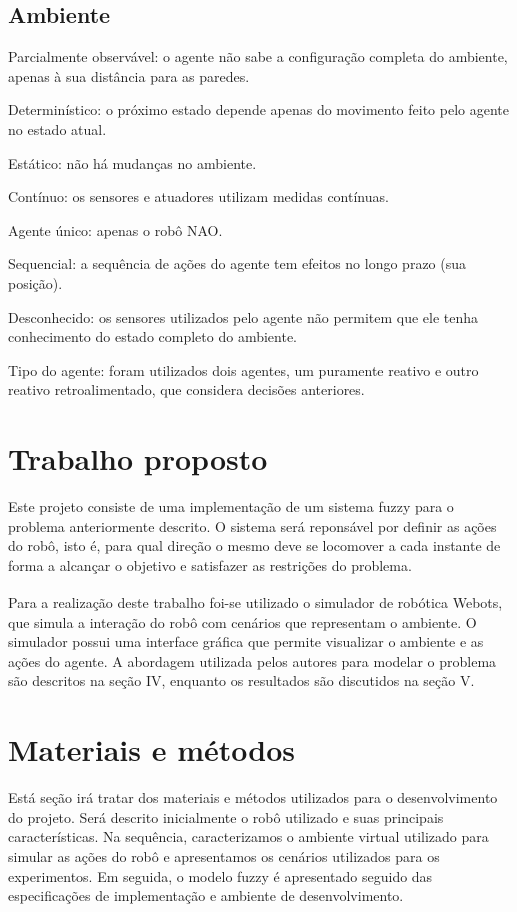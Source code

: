 \documentclass[twoside,conference,a4paper]{IEEEtran}
\begin{document}
\subsection{Ambiente}
\begin{LaTeXdescription}
\item[Parcialmente observável:] o agente não sabe a configuração completa do ambiente, apenas à sua distância para as paredes.
\item[Determinístico:] o próximo estado depende apenas do movimento feito pelo agente no estado atual.
\item[Estático:] não há mudanças no ambiente.
\item[Contínuo:] os sensores e atuadores utilizam medidas contínuas.
\item[Agente único:] apenas o robô NAO.
\item[Sequencial:] a sequência de ações do agente tem efeitos no longo prazo (sua posição).
\item[Desconhecido:] os sensores utilizados pelo agente não permitem que ele tenha conhecimento do estado completo do ambiente.
\item[Tipo do agente:] foram utilizados dois agentes, um puramente reativo e outro reativo retroalimentado, que considera decisões anteriores.
\end{LaTeXdescription}


\section{Trabalho proposto}

Este projeto consiste de uma implementação de um sistema fuzzy para o problema anteriormente descrito. O sistema será reponsável por definir as ações do robô, isto é, para qual direção o mesmo deve se locomover a cada instante de forma a alcançar o objetivo e satisfazer as restrições do problema. 

Para a realização deste trabalho foi-se utilizado o simulador de robótica Webots\textsuperscript{\textregistered}, que simula a interação do robô com cenários que representam o ambiente. O simulador possui uma interface gráfica que permite visualizar o ambiente e as ações do agente.  A abordagem utilizada pelos autores para modelar o problema são descritos na seção IV, enquanto os resultados são discutidos na seção V.


\section{Materiais e métodos}
Está seção irá tratar dos materiais e métodos utilizados para o desenvolvimento do projeto. Será descrito inicialmente o robô utilizado e suas principais características. Na sequência, caracterizamos o ambiente virtual utilizado para simular as ações do robô e apresentamos os cenários utilizados para os experimentos. Em seguida, o modelo fuzzy é apresentado seguido das especificações de implementação e ambiente de desenvolvimento.
\end{document}

